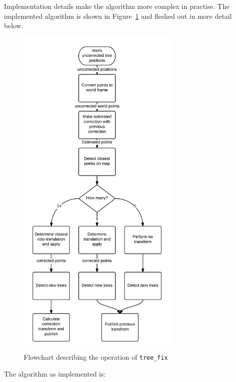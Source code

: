 \documentclass[12pt,oneside,a4paper]{book}
\begin{document}
Implementation details make the algorithm more complex in
practise. The implemented algorithm is shown in
Figure~\ref{fig:tree_fix} and fleshed out in more detail below.
\newpage
\begin{figure}[h!]
  \centering
  \includegraphics[width=0.7\textwidth]{figs/tree_fix}
  \caption{Flowchart describing the operation of \texttt{tree\_fix}}
  \label{fig:tree_fix}
\end{figure}
\newpage
The algorithm as implemented is:
\end{document}
